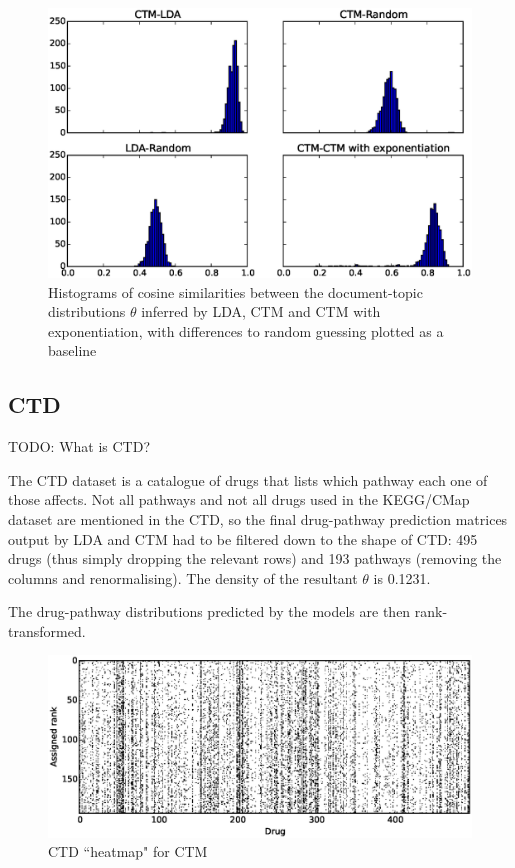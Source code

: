 \documentclass[12pt,a4paper,twoside,openright]{report}
\begin{document}
\begin{figure}[!htb]
\includegraphics[width=\textwidth]{ctd-ctm-lda-diffs.eps}
\caption{Histograms of cosine similarities between the document-topic distributions $\theta$ inferred by LDA, CTM and CTM with exponentiation, with differences to random guessing plotted as a baseline}
\label{fig:ctd-ctm-lda-diffs}
\end{figure}

\subsection{CTD}

TODO: What is CTD?

The CTD dataset is a catalogue of drugs that lists which pathway each one of those affects. Not all pathways and not all drugs used in the KEGG/CMap dataset are mentioned in the CTD, so the final drug-pathway prediction matrices output by LDA and CTM had to be filtered down to the shape of CTD: 495 drugs (thus simply dropping the relevant rows) and 193 pathways (removing the columns and renormalising). The density of the resultant $\theta$ is 0.1231.

The drug-pathway distributions predicted by the models are then rank-transformed.

\begin{figure}[!htb]
\includegraphics[width=\textwidth]{ctm-ctd-heatmap.eps}
\caption{CTD ``heatmap" for CTM}
\label{fig:ctm-ctd-heatmap}
\end{figure}
\end{document}
